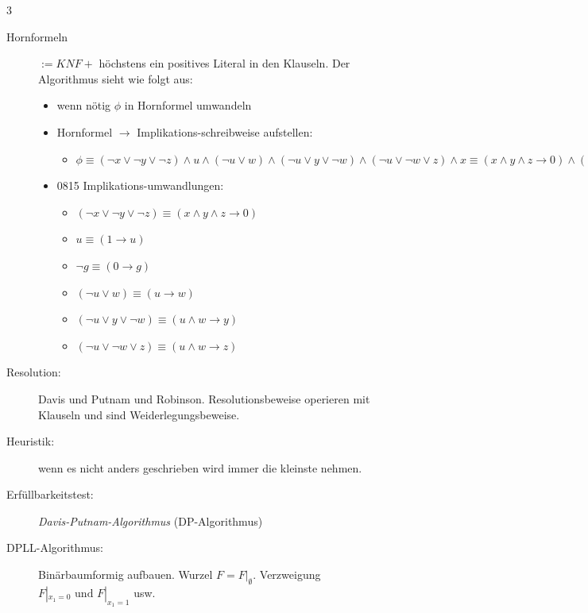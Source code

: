 \documentclass[8pt,landscape]{article}
\begin{document}
\begin{multicols}{3}
\begin{description}
  \item[Hornformeln] $ := KNF + $ h\"ochstens ein positives Literal in den Klauseln. Der Algorithmus sieht wie folgt aus:  
  \begin{itemize}
  \item wenn n\"otig $ \phi $ in Hornformel umwandeln
  \item Hornformel $ \rightarrow $ Implikations-schreibweise aufstellen:
    \begin{itemize}
    \item $ \phi \equiv (\neg x \vee \neg y \vee \neg z) \wedge u \wedge (\neg u \vee w ) \wedge (\neg u \vee y \vee \neg w) \wedge (\neg u \vee \neg w \vee z) \wedge x \equiv (x \wedge y \wedge z \rightarrow 0 ) \wedge (1 \rightarrow u) \wedge (u \rightarrow w) \wedge (u \wedge w \rightarrow y) \wedge (u \wedge w \rightarrow z) \wedge (1 \rightarrow x) $
    \end{itemize}
  \item 0815 Implikations-umwandlungen:
    \begin{itemize}
    \item $ (\neg x \vee \neg y \vee \neg z) \equiv (x \wedge y \wedge z \rightarrow 0 ) $
    \item $ u  \equiv (1 \rightarrow u) $
    \item $ \neg g \equiv ( 0 \rightarrow g ) $
    \item $ (\neg u \vee w ) \equiv (u \rightarrow w) $
    \item $ (\neg u \vee y \vee \neg w) \equiv (u \wedge w \rightarrow y) $
    \item $ (\neg u \vee \neg w \vee z) \equiv (u \wedge w \rightarrow z) $
    \end{itemize}
  \end{itemize}
  \item[Resolution:] Davis und Putnam und Robinson. Resolutionsbeweise operieren mit Klauseln und sind Weiderlegungsbeweise.
  \item[Heuristik:] wenn es nicht anders geschrieben wird immer die kleinste nehmen.
  \item[Erf\"ullbarkeitstest:] \textit{Davis-Putnam-Algorithmus} (DP-Algorithmus)
  \item[DPLL-Algorithmus:] Bin\"arbaumformig aufbauen. Wurzel $ F = F |_{\emptyset} $. Verzweigung $ F |_{x_{1} = 0} \text{ und } F |_{x_{1} = 1} $ usw.   
\end{description}


\end{multicols}
\end{document}
